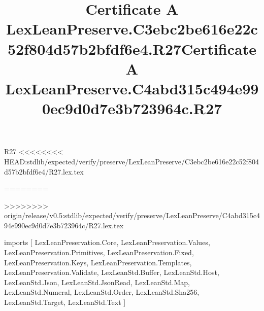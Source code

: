 \begin{lexlean}{R27}
<<<<<<<< HEAD:stdlib/expected/verify/preserve/LexLeanPreserve/C3ebc2be616e22c52f804d57b2bfdf6e4/R27.lex.tex
\title{Certificate A LexLeanPreserve.C3ebc2be616e22c52f804d57b2bfdf6e4.R27}
========
\title{Certificate A LexLeanPreserve.C4abd315c494e990ec9d0d7e3b723964c.R27}
>>>>>>>> origin/release/v0.5:stdlib/expected/verify/preserve/LexLeanPreserve/C4abd315c494e990ec9d0d7e3b723964c/R27.lex.tex
\begin{coremodule}
imports [
  LexLeanPreservation.Core,
  LexLeanPreservation.Values,
  LexLeanPreservation.Primitives,
  LexLeanPreservation.Fixed,
  LexLeanPreservation.Keys,
  LexLeanPreservation.Templates,
  LexLeanPreservation.Validate,
  LexLeanStd.Buffer,
  LexLeanStd.Host,
  LexLeanStd.Json,
  LexLeanStd.JsonRead,
  LexLeanStd.Map,
  LexLeanStd.Numeral,
  LexLeanStd.Order,
  LexLeanStd.Sha256,
  LexLeanStd.Target,
  LexLeanStd.Text
]


\end{coremodule}
\end{lexlean}
